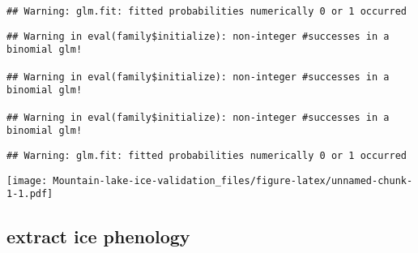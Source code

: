 \documentclass[
]{article}
\begin{document}
\begin{verbatim}
## Warning: glm.fit: fitted probabilities numerically 0 or 1 occurred
\end{verbatim}

\begin{verbatim}
## Warning in eval(family$initialize): non-integer #successes in a binomial glm!

## Warning in eval(family$initialize): non-integer #successes in a binomial glm!

## Warning in eval(family$initialize): non-integer #successes in a binomial glm!
\end{verbatim}

\begin{verbatim}
## Warning: glm.fit: fitted probabilities numerically 0 or 1 occurred
\end{verbatim}

\texttt{[image: Mountain-lake-ice-validation\_files/figure-latex/unnamed-chunk-1-1.pdf]}

\hypertarget{extract-ice-phenology}{%
\subsection{extract ice phenology}\label{extract-ice-phenology}}
\end{document}
